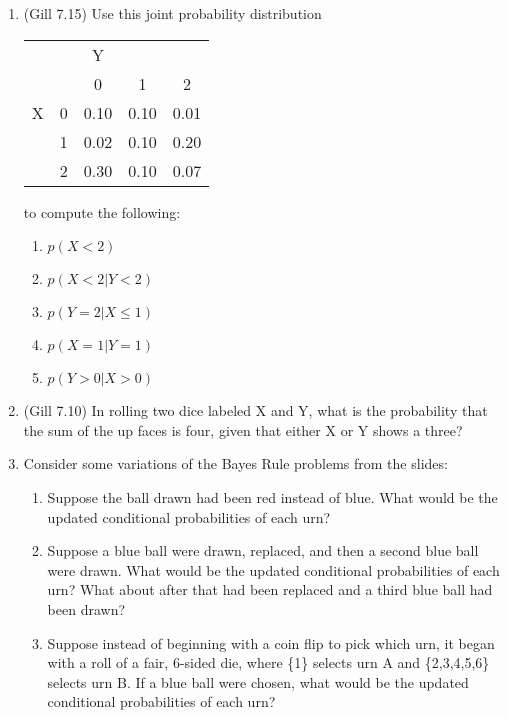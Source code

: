 \documentclass[11pt]{article}
\begin{document}
\begin{enumerate}
\item (Gill 7.15) Use this joint probability distribution
\begin{center}
\begin{tabular}{cc|ccc}
    &    & Y     &       &       \\
    &    & 0     & 1     & 2     \\ \hline
X   &0   & 0.10  & 0.10  & 0.01  \\
    &1   & 0.02  & 0.10  & 0.20  \\
    &2   & 0.30  & 0.10  & 0.07
\end{tabular}
\end{center}
to compute the following:
\begin{enumerate}
\item $p(X < 2)$
\item $p(X < 2| Y < 2)$
\item $p(Y = 2| X \leq 1)$
\item $p(X = 1| Y = 1)$
\item $p(Y > 0| X > 0)$
\end{enumerate}


\item (Gill 7.10) In rolling two dice labeled X and Y, what is the probability that the sum of the up faces is four, given that either X or Y shows a three?


\item Consider some variations of the Bayes Rule problems from the slides:
\begin{enumerate}
\item Suppose the ball drawn had been red instead of blue.  What would be the updated conditional probabilities of each urn?
\item Suppose a blue ball were drawn, replaced, and then a second blue ball were drawn.  What would be the updated conditional probabilities of each urn?  What about after that had been replaced and a third blue ball had been drawn?
\item Suppose instead of beginning with a coin flip to pick which urn, it began with a roll of a fair, 6-sided die, where \{1\} selects urn A and \{2,3,4,5,6\} selects urn B.  If a blue ball were chosen, what would be the updated conditional probabilities of each urn?
\end{enumerate}



\end{enumerate}
\end{document}
